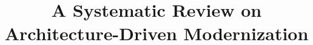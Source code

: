 \documentclass{sig-alternate}
\begin{document}
%

\title{A Systematic Review on Architecture-Driven Modernization}


%
%
%
%
\end{document}

